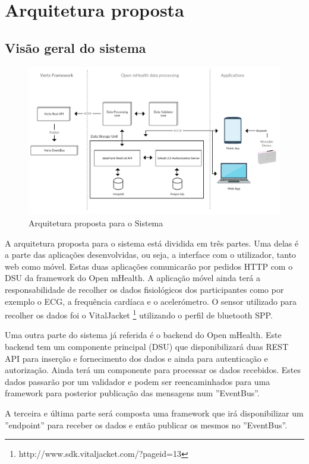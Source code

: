 \chapter{Arquitetura proposta}

\section{Visão geral do sistema}

\begin{figure}[H]
  \centering
  \includegraphics[width=1\textwidth]{imgs/arch-product.png}
  \caption[Arquitetura proposta para o Sistema]{Arquitetura proposta para o Sistema}
  
  \label{f:product-arch}
\end{figure}

A arquitetura proposta para o sistema está dividida em três partes. Uma delas é a parte das aplicações desenvolvidas, ou seja, a interface com o utilizador, tanto web como móvel. Estas duas aplicações comunicarão por pedidos \gls{HTTP} com o \gls{DSU} da framework do Open mHealth. A aplicação móvel ainda terá a responsabilidade de recolher os dados fisiológicos dos participantes como por exemplo o \gls{ECG}, a frequência cardíaca e o acelerómetro. O sensor utilizado para recolher os dados foi o VitalJacket \footnote{http://www.sdk.vitaljacket.com/?pageid=13} utilizando o perfil de bluetooth \gls{SPP}.
\par 
Uma outra parte do sistema já referida é o backend do Open mHealth. Este backend tem um componente principal (\gls{DSU}) que disponibilizará duas \gls{REST} \gls{API} para inserção e fornecimento dos dados e ainda para autenticação e autorização. Ainda terá um componente para processar os dados recebidos. Estes dados passarão por um validador e podem ser reencaminhados para uma framework para posterior publicação das mensagens num ''EventBus''.
\par
A terceira e última parte será composta uma framework que irá disponibilizar um ''endpoint'' para receber os dados e então publicar os mesmos no ''EventBus''.







